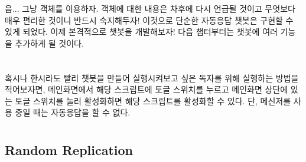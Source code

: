 \documentclass[10pt,a4paper,final]{book}
\begin{document}
음... 그냥 객체를 이용하자.
객체에 대한 내용은 차후에 다시 언급될 것이고 무엇보다 매우 편리한 것이니 반드시 숙지해두자!
이것으로 단순한 자동응답 챗봇은 구현할 수 있게 되었다.
이제 본격적으로 챗봇을 개발해보자! 다음 챕터부터는 챗봇에 여러 기능을 추가하게 될 것이다.
\\
\\
\\
혹시나 한시라도 빨리 챗봇을 만들어 실행시켜보고 싶은 독자를 위해 실행하는 방법을 적어보자면,
메인화면에서 해당 스크립트에 토글 스위치를 누르고 메인화면 상단에 있는 토글 스위치를 눌러
활성화하면 해당 스크립트를 활성화할 수 있다. 단, 메신저를 사용 중일 때는 자동응답을 할 수 없다.

\chapter{}

\section{Random Replication}
\end{document}

